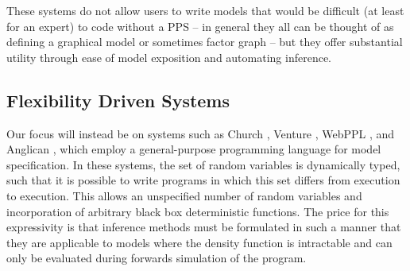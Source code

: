 These systems do not allow users to write models that would be difficult (at least for
an expert) to code without a PPS -- in general they all can be thought of as defining a graphical model
or sometimes factor graph -- but they offer substantial utility through ease of model exposition and
automating inference.

\subsection{Flexibility Driven Systems}
\label{sec:probprog:two:general}

Our focus will instead be on systems such as Church \citep{goodman_uai_2008}, Venture \citep{mansinghka2014venture}, 
WebPPL \citep{goodman_book_2014}, and Anglican \citep{wood2014new}, which employ a general-purpose programming 
language for model specification. In these systems, the set of random variables is dynamically typed, such that it is possible 
to write programs in which this set differs from execution to execution.  This allows an unspecified number of random 
variables and incorporation of arbitrary black box deterministic functions. The price for this expressivity is that inference 
methods must be formulated in such a manner that they are applicable to models where the density function is intractable 
and can only be evaluated during forwards simulation of the program. 

